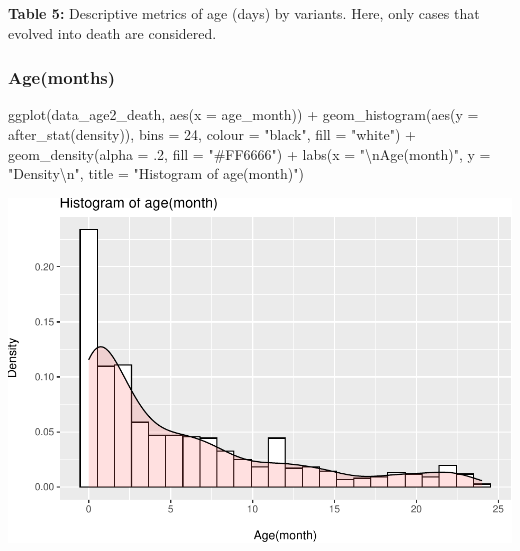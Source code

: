 \documentclass[
]{article}
\newenvironment{Shaded}{\begin{snugshade}}{\end{snugshade}}
\newcommand{\AttributeTok}[1]{\textcolor[rgb]{0.77,0.63,0.00}{#1}}
\newcommand{\DecValTok}[1]{\textcolor[rgb]{0.00,0.00,0.81}{#1}}
\newcommand{\FunctionTok}[1]{\textcolor[rgb]{0.00,0.00,0.00}{#1}}
\newcommand{\NormalTok}[1]{#1}
\newcommand{\SpecialCharTok}[1]{\textcolor[rgb]{0.00,0.00,0.00}{#1}}
\newcommand{\StringTok}[1]{\textcolor[rgb]{0.31,0.60,0.02}{#1}}
\renewenvironment{Shaded}{\begin{mdframed}[ backgroundcolor=shadecolor, linecolor = shadecolor, leftmargin=\dimexpr\leftmargin-2pt\relax, innerleftmargin=1.6pt, innertopmargin=5pt, skipabove=10pt,skipbelow=3pt ]}{\end{mdframed}}
\begin{document}
\textbf{Table 5:} Descriptive metrics of age (days) by variants. Here,
only cases that evolved into death are considered.

\hypertarget{agemonths}{%
\subsubsection{Age(months)}\label{agemonths}}

\begin{Shaded}
\begin{Highlighting}[]
\FunctionTok{ggplot}\NormalTok{(data\_age2\_death, }\FunctionTok{aes}\NormalTok{(}\AttributeTok{x =}\NormalTok{ age\_month)) }\SpecialCharTok{+} 
  \FunctionTok{geom\_histogram}\NormalTok{(}\FunctionTok{aes}\NormalTok{(}\AttributeTok{y =} \FunctionTok{after\_stat}\NormalTok{(density)), }
                 \AttributeTok{bins =} \DecValTok{24}\NormalTok{,}
                 \AttributeTok{colour =} \StringTok{"black"}\NormalTok{,}
                 \AttributeTok{fill =} \StringTok{"white"}\NormalTok{) }\SpecialCharTok{+}
  \FunctionTok{geom\_density}\NormalTok{(}\AttributeTok{alpha =}\NormalTok{ .}\DecValTok{2}\NormalTok{, }\AttributeTok{fill =} \StringTok{"\#FF6666"}\NormalTok{) }\SpecialCharTok{+}
  \FunctionTok{labs}\NormalTok{(}\AttributeTok{x =} \StringTok{"}\SpecialCharTok{\textbackslash{}n}\StringTok{Age(month)"}\NormalTok{,}
       \AttributeTok{y =} \StringTok{"Density}\SpecialCharTok{\textbackslash{}n}\StringTok{"}\NormalTok{,}
       \AttributeTok{title =} \StringTok{"Histogram of age(month)"}\NormalTok{)}
\end{Highlighting}
\end{Shaded}

\includegraphics{age_analysis_files/figure-latex/unnamed-chunk-15-1.pdf}
\end{document}

